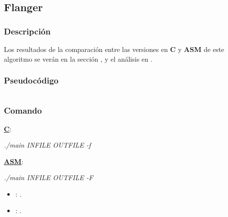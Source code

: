 \subsection{Flanger}
\label{subsec:desarrollo-flanger}

\subsubsection{Descripción}
\label{subsec:desarrollo-flanger-desc}


\vspace{\baselineskip}

Los resultados de la comparación entre las versiones en \textbf{C} y \textbf{ASM} de este algoritmo se verán en la sección , y el análisis en .

\subsubsection{Pseudocódigo}
\label{subsec:desarrollo-flanger-code}

\lstset{language=C}
\begin{lstlisting}[frame=single]
\end{lstlisting}

\subsubsection{Comando}
\label{subsec:desarrollo-flanger-call}

\underline{\textbf{C}}:
\begin{center}
 \textit{./main INFILE OUTFILE -f}
\end{center}

\underline{\textbf{ASM}}:
\begin{center}
 \textit{./main INFILE OUTFILE -F}
\end{center}

\begin{itemize}
 \item \textit{}: .
 \item \textit{}: .
\end{itemize}
 
